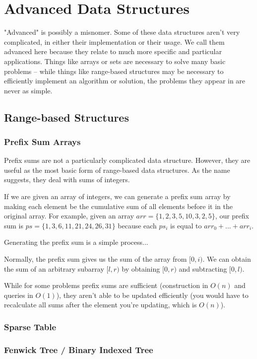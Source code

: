 \section{Advanced Data Structures}

"Advanced" is possibly a misnomer. Some of these data structures aren't very complicated, in either their implementation or their usage. We call them advanced here because they relate to much more specific and particular applications. Things like arrays or sets are necessary to solve many basic problems -- while things like range-based structures may be necessary to efficiently implement an algorithm or solution, the problems they appear in are never as simple.

\subsection{Range-based Structures}
\subsubsection{Prefix Sum Arrays}

Prefix sums are not a particularly complicated data structure. However, they are useful as the most basic form of range-based data structures. As the name suggests, they deal with sums of integers.

If we are given an array of integers, we can generate a prefix sum array by making each element be the cumulative sum of all elements before it in the original array. For example, given an array $arr = \{1,2,3,5,10,3,2,5\}$, our prefix sum is $ps = \{1,3,6,11,21,24,26,31\}$ because each $ps_i$ is equal to $arr_0 + ... + arr_i$.

Generating the prefix sum is a simple process...

Normally, the prefix sum gives us the sum of the array from $[0,i)$. We can obtain the sum of an arbitrary subarray $[l,r)$ by obtaining $[0,r)$ and subtracting $[0,l)$. 

While for some problems prefix sums are sufficient (construction in $O(n)$ and queries in $O(1)$), they aren't able to be updated efficiently (you would have to recalculate all sums after the element you're updating, which is $O(n)$).

\subsubsection{Sparse Table}
\subsubsection{Fenwick Tree / Binary Indexed Tree}

